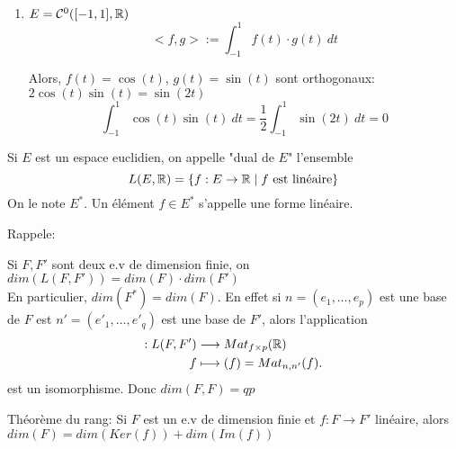 \begin{eg}
   \begin{enumerate}
       \item $E = \mathcal{C}^0([-1, 1], \mathbb{R})$
            \[
                <f, g> := \int_{-1}^{1} f(t) \cdot g(t) \: d{t} 
            \] 
            \begin{center}
   \end{center}
   Alors, $f(t) = \cos(t)$, $g(t) = \sin(t)$ sont orthogonaux: $2\cos(t)\sin(t) = \sin(2t)$
   \[
       \int_{-1}^{1} \cos(t)\sin(t)\:d{t} = \frac{1}{2}\int_{-1}^{1} \sin(2t) \: d{t} = 0  
   \] 
   \end{enumerate} 
\end{eg}
\begin{definition}
    Si $E$ est un espace euclidien, on appelle "dual de $E$" l'ensemble
    \[
        L(E, \mathbb{R}) = \{ f: E \to \mathbb{R} \mid f \text{ est linéaire}\}
    \] 
    On le note $E^*$. Un élément  $f \in E^*$ s'appelle une forme linéaire.
\end{definition}
Rappele:
\begin{prop}
    Si $F, F'$ sont deux e.v de dimension finie, on  $dim(L(F, F')) = dim(F)\cdot dim(F')$\\
    En particulier,  $dim(F^*) = dim(F)$. En effet si  $n = (e_1, \ldots, e_p)$ est une base de $F$ est  $n' = (e'_1, \ldots, e'_q)$ est une base de $F'$, alors l'application
    \begin{align*}
        : L(F, F') &\longrightarrow Mat_{f\times p}(\mathbb{R}) \\
        f &\longmapsto (f) = Mat_{n,n'}(f)
    .\end{align*}
    est un isomorphisme. Donc $dim(F, F) = qp$
\end{prop}
\begin{theorem}
    Théorème du rang: Si  $F$ est un e.v de dimension finie et  $f: F \to F'$ linéaire, alors $dim(F) = dim(Ker(f)) + dim(Im(f))$
\end{theorem}
